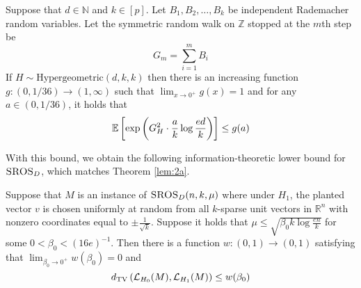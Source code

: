 \begin{lemma}  \label{lem:hgmw}
Suppose that $d \in \mathbb{N}$ and $k \in [p]$. Let $B_1, B_2, \dots, B_k$ be independent Rademacher random variables. Let the symmetric random walk on $\mathbb{Z}$ stopped at the $m$th step be
$$G_m = \sum_{i = 1}^m B_i$$
If $H \sim \text{Hypergeometric}(d, k, k)$ then there is an increasing function $g : (0, 1/36) \to (1, \infty)$ such that $\lim_{x \to 0^+} g(x) = 1$ and for any $a \in (0, 1/36)$, it holds that
$$\mathbb{E}\left[ \exp\left( G_H^2 \cdot \frac{a}{k} \log \frac{ed}{k} \right) \right] \le g(a)$$
\end{lemma}

With this bound, we obtain the following information-theoretic lower bound for $\textsc{SROS}_D$, which matches Theorem \ref{lem:2a}.

\begin{theorem} \label{thm:sswinf}
Suppose that $M$ is an instance of $\textsc{SROS}_D(n, k, \mu)$ where under $H_1$, the planted vector $v$ is chosen uniformly at random from all $k$-sparse unit vectors in $\mathbb{R}^n$ with nonzero coordinates equal to $\pm \frac{1}{\sqrt{k}}$. Suppose it holds that $\mu \le \sqrt{\beta_0 k \log \frac{en}{k}}$ for some $0 < \beta_0 < (16e)^{-1}$. Then there is a function $w : (0, 1) \to (0, 1)$ satisfying that $\lim_{\beta_0 \to 0^+} w(\beta_0) = 0$ and
$$d_{\text{TV}}\left( \mathcal{L}_{H_0}(M), \mathcal{L}_{H_1}(M) \right) \le w(\beta_0)$$
\end{theorem}

